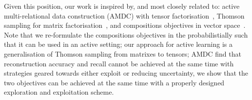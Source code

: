 Given this position, our work is inspired by, and most closely related to:
active multi-relational data construction (AMDC) 
with tensor factorisation~\cite{kajino2015active}, 
Thomson sampling for matrix factorisation~\cite{kawale2015efficient}, 
and compositions objectives in vector space~\cite{guu2015traversing}.
Note that we re-formulate the compositions objectives in the 
probabilistially such that it can be used in an active setting; 
our approach for active learning is a generalisation of
Thomson sampling from matrixes to tensors; 
AMDC find that reconstruction accuracy and recall 
cannot be achieved at the same time with strategies geared towards 
either exploit or reducing uncertainty, 
we show that the two objectives can be achieved at the same time with 
a properly designed exploration and exploitation scheme. 



%

